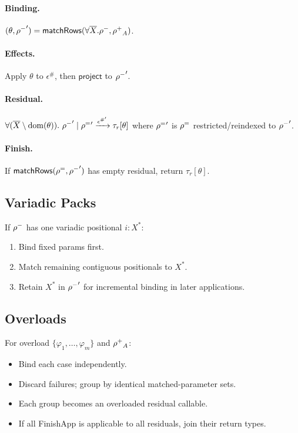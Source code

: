 \paragraph{Binding.}
$(\theta, \mathord{\rho^{-}}') = \mathsf{matchRows}(\forall\overline{X}.\mathord{\rho^{-}},\mathord{\rho^{+}}_A)$.

\paragraph{Effects.}
Apply $\theta$ to $\epsilon^\#$, then $\mathsf{project}$ to $\mathord{\rho^{-}}'$.

\paragraph{Residual.} $\forall(\overline{X} \setminus \mathrm{dom}(\theta)).~\mathord{\rho^{-}}' \mid \mathord{\rho^{=}}' \xrightarrow{\epsilon^{\#'}} \tau_r[\theta]$
where $\mathord{\rho^{=}}'$ is $\mathord{\rho^{=}}$ restricted/reindexed to $\mathord{\rho^{-}}'$.

\paragraph{Finish.}
If $\mathsf{matchRows}(\mathord{\rho^{=}},\mathord{\rho^{-}}')$ has empty residual, return $\tau_r[\theta]$.

\subsection{Variadic Packs}
If $\mathord{\rho^{-}}$ has one variadic positional $i:X^*$:
\begin{enumerate}
  \item Bind fixed params first.
  \item Match remaining contiguous positionals to $X^*$.
  \item Retain $X^*$ in $\mathord{\rho^{-}}'$ for incremental binding in later applications.
\end{enumerate}

\subsection{Overloads}
For overload $\{\varphi_1,\dots,\varphi_m\}$ and $\mathord{\rho^{+}}_A$:
\begin{itemize}
  \item Bind each case independently.
  \item Discard failures; group by identical matched-parameter sets.
  \item Each group becomes an overloaded residual callable.
  \item If all \textsf{FinishApp} is applicable to all residuals, join their return types.
\end{itemize}

